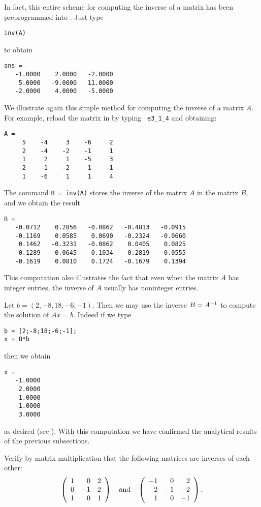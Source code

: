 In fact, this entire scheme for computing the inverse of a
matrix has been preprogrammed into \Matlab.  Just type
\begin{verbatim}
inv(A)
\end{verbatim} 
to obtain
\begin{verbatim}
ans =
   -1.0000    2.0000   -2.0000
    5.0000   -9.0000   11.0000
   -2.0000    4.0000   -5.0000
\end{verbatim}

We illustrate again this simple method for computing the inverse
of a matrix $A$.  For example, reload the matrix in 
by typing \verb+ e3_1_4+ and obtaining:
\begin{verbatim}
A =
     5    -4     3    -6     2
     2    -4    -2    -1     1
     1     2     1    -5     3
    -2    -1    -2     1    -1
     1    -6     1     1     4
\end{verbatim}
The command {\tt B = inv(A)} stores the inverse of the matrix $A$
in the matrix $B$, and we obtain the result
\begin{verbatim}
B =
   -0.0712    0.2856   -0.0862   -0.4813   -0.0915
   -0.1169    0.0585    0.0690   -0.2324   -0.0660
    0.1462   -0.3231   -0.0862    0.0405    0.0825
   -0.1289    0.0645   -0.1034   -0.2819    0.0555
   -0.1619    0.0810    0.1724   -0.1679    0.1394
\end{verbatim}
This computation also illustrates the fact that even when the matrix
$A$ has integer entries, the inverse of $A$ usually has noninteger
entries.

Let $b=(2,-8,18,-6,-1)$.  Then we may use the inverse $B=A^{-1}$
to compute the solution of $Ax=b$.  Indeed if we type
\begin{verbatim}
b = [2;-8;18;-6;-1];
x = B*b
\end{verbatim}
then we obtain
\begin{verbatim}
x =
   -1.0000
    2.0000
    1.0000
   -1.0000
    3.0000
\end{verbatim}
as desired (see ).  With this computation we have confirmed
the analytical results of the previous subsections.





\EXER

\TEXER

\begin{exercise} \label{c4.8.1}
Verify by matrix multiplication that the following matrices are inverses
of each other:
\[
\left( \begin{array}{rrr}
1  &  0  &  2\\
0  & -1  &  2\\
1  &  0  &  1
\end{array} \right)\quad\mbox{and}\quad
\left( \begin{array}{rrr}
-1 &   0 &   2\\
 2 &  -1 &  -2\\
 1 &   0 &  -1
\end{array} \right).
\]
\end{exercise}

